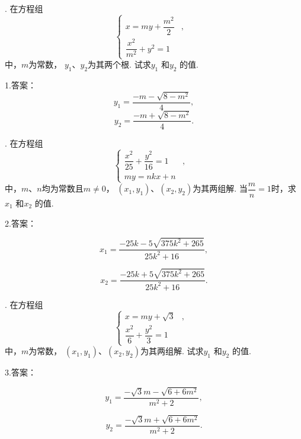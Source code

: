 \documentclass[UTF8]{ctexart}
\begin{document}
. 在方程组\begin{equation*}
    \left\{
    \begin{aligned}
    x=my+\dfrac{m^2}{2} &,& \\
     \dfrac{x^2}{m^2}+y^2=1& &
    \end{aligned}
    \right.
    \end{equation*}中，$m$为常数， $y_1$、$y_2$为其两个根. 试求$y_1$ 和$y_2$ 的值.\vspace{3cm}
    
\noindent 1.答案： $$y_1=\dfrac{-m-\sqrt{8-m^2}}{4},$$
     $$y_2=\dfrac{-m+\sqrt{8-m^2}}{4}.$$
      \newpage
    
. 在方程组\begin{equation*}
    \left\{
    \begin{aligned}
     \dfrac{x^2}{25}+\dfrac{y^2}{16}=1&,& \\
     my=nkx+n& &
    \end{aligned}
    \right.
    \end{equation*}中，$m$、$n$均为常数且$m\neq0$， $(x_1,y_1)$、$(x_2,y_2)$为其两组解.  
    当$\dfrac{m}{n}=1$时，求$x_1$ 和$x_2$ 的值.\vspace{3cm}
    
{\color{red}
\noindent 2.答案：

$$x_1=\dfrac{-25k-5\sqrt{375k^2+265}}{25k^2+16},$$
     
$$x_2=\dfrac{-25k+5\sqrt{375k^2+265}}{25k^2+16}.$$
}
      \newpage
    
. 在方程组\begin{equation*}
    \left\{
    \begin{aligned}
     x=my+\sqrt{3}&,& \\
     \dfrac{x^2}{6}+\dfrac{y^2}{3}=1& &
    \end{aligned}
    \right.
    \end{equation*}中，$m$为常数， $(x_1,y_1)$、$(x_2,y_2)$为其两组解. 
    试求$y_1$ 和$y_2$ 的值.\vspace{3cm}
    


\noindent 3.答案： 
{\color{red}
$$y_1=\dfrac{-\sqrt{3}m-\sqrt{6+6m^2}}{m^2+2},$$
     
$$y_2=\dfrac{-\sqrt{3}m+\sqrt{6+6m^2}}{m^2+2}.$$
}
      \newpage
    
\end{document}
